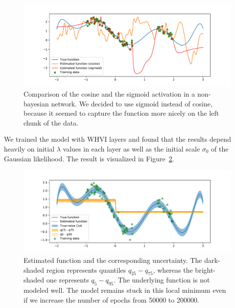 \begin{figure}[htb]
    \centering
    \includegraphics[width=1.0\hsize]{img/toy-function-non-bayesian}
    \caption{Comparison of the cosine and the sigmoid activation in a non-bayesian network.
    We decided to use sigmoid instead of cosine, because it seemed to capture the function more nicely on the left chunk of the data.}
    \label{fig:toy-function-non-bayesian}
\end{figure}

We trained the model with WHVI layers and found that the results depend heavily on initial $\lambda$ values in each layer as well as the initial scale $\sigma_0$ of the Gaussian likelihood.
The result is visualized in Figure~\ref{fig:toy-function-whvi}.
\begin{figure}[htbp]
    \centering
    \includegraphics[width=1.0\hsize]{img/bayesian-fit-with-kl}
    \caption{
    Estimated function and the corresponding uncertainty.
    The dark-shaded region represents quantiles $q_{25}-q_{75}$, whereas the bright-shaded one represents $q_{5}-q_{95}$.
    The underlying function is not modeled well.
    The model remains stuck in this local minimum even if we increase the number of epochs from 50000 to 200000.}
    \label{fig:toy-function-whvi}
\end{figure}

